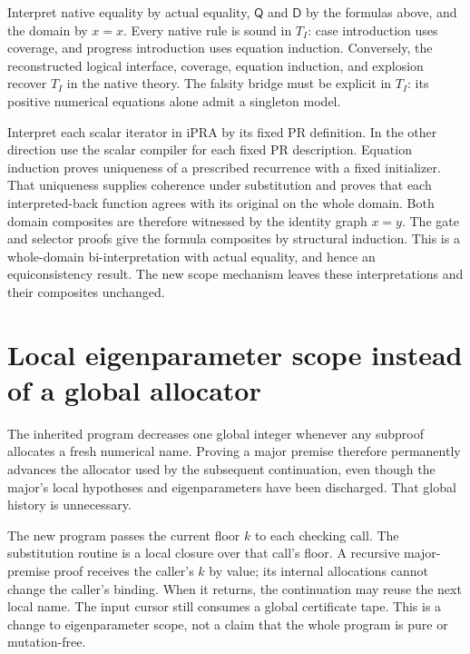 \documentclass[11pt,letterpaper]{article}
\theoremstyle{definition}\newtheorem{definition}[theorem]{Definition}
\theoremstyle{remark}\newtheorem{remark}[theorem]{Remark}
\newcommand{\Q}{\mathsf Q}
\newcommand{\D}{\mathsf D}
\begin{document}
Interpret native equality by actual equality, $\Q$ and $\D$ by
the formulas above, and the domain by $x=x$. Every native rule is
sound in $T_I$: case introduction uses coverage, and progress
introduction uses equation induction. Conversely, the reconstructed
logical interface, coverage, equation induction, and explosion recover
$T_I$ in the native theory. The falsity bridge must be explicit in
$T_I$: its positive numerical equations alone admit a singleton model.

Interpret each scalar iterator in iPRA by its fixed PR definition.
In the other direction use the scalar compiler for each fixed PR
description. Equation induction proves uniqueness of a prescribed
recurrence with a fixed initializer. That uniqueness supplies coherence
under substitution and proves that each interpreted-back function
agrees with its original on the whole domain. Both domain composites
are therefore witnessed by the identity graph $x=y$. The gate and
selector proofs give the formula composites by structural induction.
This is a whole-domain bi-interpretation with actual equality, and hence
an equiconsistency result. The new scope mechanism leaves these
interpretations and their composites unchanged.

\section{Local eigenparameter scope instead of a global allocator}
\label{sec:local}

The inherited program decreases one global integer whenever any
subproof allocates a fresh numerical name. Proving a major premise
therefore permanently advances the allocator used by the subsequent
continuation, even though the major's local hypotheses and eigenparameters
have been discharged. That global history is unnecessary.

The new program passes the current floor $k$ to each checking call.
The substitution routine is a local closure over that call's floor.
A recursive major-premise proof receives the caller's $k$ by value;
its internal allocations cannot change the caller's binding. When it
returns, the continuation may reuse the next local name.
The input cursor still consumes a global certificate tape. This is a
change to eigenparameter scope, not a claim that the whole program is
pure or mutation-free.
\end{document}
